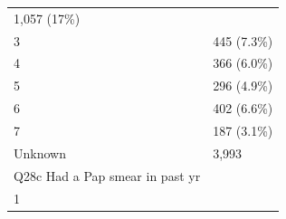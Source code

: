 \documentclass[]{article}
\begin{document}
\begin{longtable}[]{@{}ll@{}}
\begin{minipage}[t]{0.23\columnwidth}
1,057 (17\%)\strut
\end{minipage}\tabularnewline
\begin{minipage}[t]{0.71\columnwidth}\raggedright
3\strut
\end{minipage} & \begin{minipage}[t]{0.23\columnwidth}\raggedright
445 (7.3\%)\strut
\end{minipage}\tabularnewline
\begin{minipage}[t]{0.71\columnwidth}\raggedright
4\strut
\end{minipage} & \begin{minipage}[t]{0.23\columnwidth}\raggedright
366 (6.0\%)\strut
\end{minipage}\tabularnewline
\begin{minipage}[t]{0.71\columnwidth}\raggedright
5\strut
\end{minipage} & \begin{minipage}[t]{0.23\columnwidth}\raggedright
296 (4.9\%)\strut
\end{minipage}\tabularnewline
\begin{minipage}[t]{0.71\columnwidth}\raggedright
6\strut
\end{minipage} & \begin{minipage}[t]{0.23\columnwidth}\raggedright
402 (6.6\%)\strut
\end{minipage}\tabularnewline
\begin{minipage}[t]{0.71\columnwidth}\raggedright
7\strut
\end{minipage} & \begin{minipage}[t]{0.23\columnwidth}\raggedright
187 (3.1\%)\strut
\end{minipage}\tabularnewline
\begin{minipage}[t]{0.71\columnwidth}\raggedright
Unknown\strut
\end{minipage} & \begin{minipage}[t]{0.23\columnwidth}\raggedright
3,993\strut
\end{minipage}\tabularnewline
\begin{minipage}[t]{0.71\columnwidth}\raggedright
Q28c Had a Pap smear in past yr\strut
\end{minipage} & \begin{minipage}[t]{0.23\columnwidth}\raggedright
\strut
\end{minipage}\tabularnewline
\begin{minipage}[t]{0.71\columnwidth}\raggedright
1\strut
\end{minipage} & \begin{minipage}[t]{0.23\columnwidth}\raggedright

\end{minipage}
\end{longtable}
\end{document}
